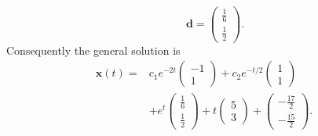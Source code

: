 \documentclass[11pt,oneside]{article}
\begin{document}
\begin{solution}
\[    \qquad
    \mathbf{d}=\begin{pmatrix}\frac16\\\frac12\end{pmatrix}.
\]
Consequently the general solution is
\[
    \boxed{\begin{aligned}
        \mathbf{x}(t)={}&c_1e^{-2t}\begin{pmatrix}-1\\1\end{pmatrix}
        +c_2e^{-t/2}\begin{pmatrix}1\\1\end{pmatrix}\\
        &+e^t\begin{pmatrix}\frac16\\\frac12\end{pmatrix}
        +t\begin{pmatrix}5\\3\end{pmatrix}
        +\begin{pmatrix}-\frac{17}{2}\\-\frac{15}{2}\end{pmatrix}.
    \end{aligned}}
\]
\end{solution}
\end{document}
